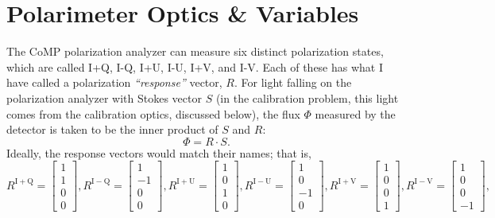 \documentclass[11pt]{article}
\begin{document}
\section{Polarimeter Optics \& Variables}

The CoMP polarization analyzer can measure six distinct polarization states, which are called I+Q, I-Q, I+U, I-U, I+V, and I-V. Each of these has what I have called a polarization {\em ``response''} vector, $R$. For light falling on the polarization analyzer with Stokes vector $S$ (in the calibration problem, this light comes from the calibration optics, discussed below), the flux $\Phi$ measured by the detector is taken to be the inner product of $S$ and $R$:
\begin{equation}\label{eq:modelflux}
	\Phi = R \cdot S.
\end{equation}
Ideally, the response vectors would match their names; that is,
\begin{equation}
		R^{\mathrm{I+Q}} =
			\begin{bmatrix}
				1 \\ 1 \\ 0 \\ 0
			\end{bmatrix},
		R^{\mathrm{I-Q}} =
			\begin{bmatrix}
				1 \\ -1 \\ 0 \\ 0
			\end{bmatrix},
		R^{\mathrm{I+U}} =
			\begin{bmatrix}
				1 \\ 0 \\ 1 \\ 0
			\end{bmatrix},
		R^{\mathrm{I-U}} =
			\begin{bmatrix}
				1 \\ 0 \\ -1 \\ 0
			\end{bmatrix},
		R^{\mathrm{I+V}} =
			\begin{bmatrix}
				1 \\ 0 \\ 0 \\ 1
			\end{bmatrix},
		R^{\mathrm{I-V}} =
			\begin{bmatrix}
				1 \\ 0 \\ 0 \\ -1
			\end{bmatrix},
\end{equation}
\end{document}
